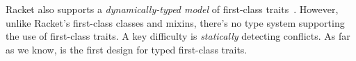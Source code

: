 Racket also supports a \emph{dynamically-typed model} of first-class
traits~\citep{DBLP:conf/aplas/FlattFF06}. However, unlike Racket's first-class classes and
mixins, there's no type system supporting the use of first-class
traits. A key difficulty is \emph{statically} detecting conflicts.
As far as we know, \namee is the first design for typed first-class traits.





